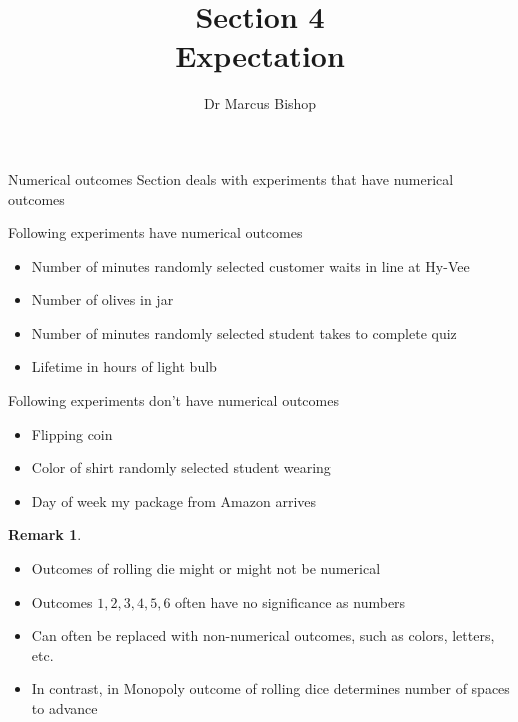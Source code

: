 \documentclass{beamer}
\title[\S4]{Section 4\\Expectation}
\author{Dr Marcus Bishop}
\theoremstyle{definition}
\newtheorem{remark}{Remark}
\begin{document}
\begin{frame}\titlepage\end{frame}
\LogoOff

\begin{frame}{Numerical outcomes}
Section deals with experiments
that have \alert{numerical outcomes}
\begin{example}
Following experiments have numerical outcomes
\begin{itemize}
\item Number of minutes randomly selected
customer waits in line at Hy-Vee
\item Number of olives in jar
\item Number of minutes randomly selected
student takes to complete quiz
\item Lifetime in hours of light bulb
\end{itemize}
\end{example}
\end{frame}

\begin{frame}
\begin{example}
Following experiments \alert{don't} have numerical outcomes
\begin{itemize}
\item Flipping coin
\item Color of shirt randomly selected student wearing
\item Day of week my package from Amazon arrives
\end{itemize}
\end{example}
\begin{remark}
\begin{itemize}
\item Outcomes of rolling die might or might not be numerical
\item Outcomes $1,2,3,4,5,6$  often have no significance as numbers
\item Can often be replaced with non-numerical outcomes,
such as colors, letters, etc.
\item In contrast, in Monopoly outcome of rolling dice
determines \alert{number} of spaces to advance
\end{itemize}
\end{remark}
\end{frame}
\end{document}
